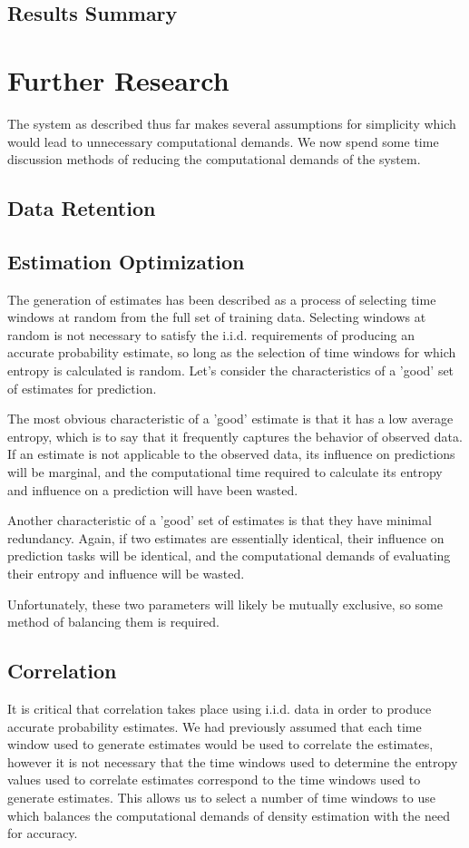 \documentclass[10pt]{article}
\begin{document}
\subsection{Results Summary}


\section{Further Research}
The system as described thus far makes several assumptions for simplicity which would lead to unnecessary computational demands.  We now spend some time discussion methods of reducing the computational demands of the system.  

\subsection{Data Retention}

\subsection{Estimation Optimization}
The generation of estimates has been described as a process of selecting time windows at random from the full set of training data.  Selecting windows at random is not necessary to satisfy the i.i.d. requirements of producing an accurate probability estimate, so long as the selection of time windows for which entropy is calculated is random.  Let's consider the characteristics of a 'good' set of estimates for prediction.  

The most obvious characteristic of a 'good' estimate is that it has a low average entropy, which is to say that it frequently captures the behavior of observed data.  If an estimate is not applicable to the observed data, its influence on predictions will be marginal, and the computational time required to calculate its entropy and influence on a prediction will have been wasted.  

Another characteristic of a 'good' set of estimates is that they have minimal redundancy.  Again, if two estimates are essentially identical, their influence on prediction tasks will be identical, and the computational demands of evaluating their entropy and influence will be wasted. 

Unfortunately, these two parameters will likely be mutually exclusive, so some method of balancing them is required.

\subsection{Correlation}
It is critical that correlation takes place using i.i.d. data in order to produce accurate probability estimates.  We had previously assumed that each time window used to generate estimates would be used to correlate the estimates, however it is not necessary that the time windows used to determine the entropy values used to correlate estimates correspond to the time windows used to generate estimates.  This allows us to select a number of time windows to use which balances the computational demands of density estimation with the need for accuracy.
\end{document}
